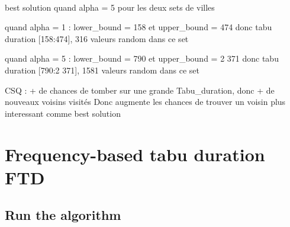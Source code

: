 \documentclass[12pt,oneside,a4paper]{article}
\begin{document}
\paragraph{}
best solution quand alpha = 5 pour les deux sets de villes

quand alpha = 1 : lower\_bound = 158 et upper\_bound = 474
donc tabu duration [158:474], 316 valeurs random dans ce set

quand alpha = 5 : lower\_bound = 790 et upper\_bound = 2 371
donc tabu duration [790:2 371], 1581 valeurs random dans ce set

CSQ : + de chances de tomber sur une grande Tabu\_duration, donc + de nouveaux voisins visités 
Donc augmente les chances  de trouver un voisin plus interessant comme best solution

\newpage
\section{Frequency-based tabu duration FTD}

\subsection{Run the algorithm}
\end{document}
